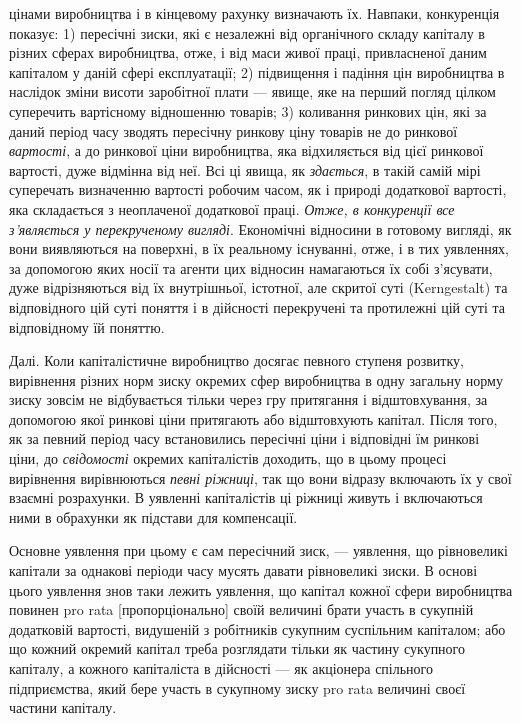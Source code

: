 \parcont{}  %
цінами виробництва і в кінцевому рахунку визначають їх. Навпаки,
конкуренція показує: 1) пересічні зиски, які є незалежні від
органічного складу капіталу в різних сферах виробництва, отже,
і від маси живої праці, привласненої даним капіталом у даній сфері
експлуатації; 2) підвищення і падіння цін виробництва в наслідок
зміни висоти заробітної плати — явище, яке на перший
погляд цілком суперечить вартісному відношенню товарів;
3) коливання ринкових цін, які за даний період часу зводять
пересічну ринкову ціну товарів не до ринкової \emph{вартості}, а до
ринкової ціни виробництва, яка відхиляється від цієї ринкової
вартості, дуже відмінна від неї. Всі ці явища, як \emph{здається}, в такій
самій мірі суперечать визначенню вартості робочим часом,
як і природі додаткової вартості, яка складається з неоплаченої
додаткової праці. \emph{Отже, в конкуренції все з’являється у перекрученому
вигляді}. Економічні відносини в готовому вигляді, як
вони виявляються на поверхні, в їх реальному існуванні, отже,
і в тих уявленнях, за допомогою яких носії та агенти цих
відносин намагаються їх собі з’ясувати, дуже відрізняються
від їх внутрішньої, істотної, але скритої суті (Kerngestalt) та відповідного
цій суті поняття і в дійсності перекручені та протилежні
цій суті та відповідному їй поняттю.

Далі. Коли капіталістичне виробництво досягає певного ступеня
розвитку, вирівнення різних норм зиску окремих сфер виробництва
в одну загальну норму зиску зовсім не відбувається
тільки через гру притягання і відштовхування, за допомогою
якої ринкові ціни притягають або відштовхують капітал. Після
того, як за певний період часу встановились пересічні ціни
і відповідні їм ринкові ціни, до \emph{свідомості} окремих капіталістів
доходить, що в цьому процесі вирівнення вирівнюються \emph{певні
ріжниці}, так що вони відразу включають їх у свої взаємні розрахунки.
В уявленні капіталістів ці ріжниці живуть і включаються
ними в обрахунки як підстави для компенсації.

Основне уявлення при цьому є сам пересічний зиск, —
уявлення, що рівновеликі капітали за однакові періоди часу мусять
давати рівновеликі зиски. В основі цього уявлення знов
таки лежить уявлення, що капітал кожної сфери виробництва
повинен pro rata [пропорціонально] своїй величині брати участь
в сукупній додатковій вартості, видушеній з робітників сукупним
суспільним капіталом; або що кожний окремий капітал треба
розглядати тільки як частину сукупного капіталу, а кожного
капіталіста в дійсності — як акціонера спільного підприємства,
який бере участь в сукупному зиску pro rata величині своєї частини
капіталу.

